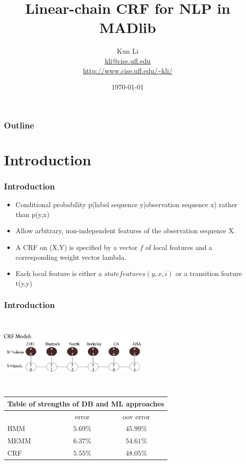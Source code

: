 \documentclass{beamer}
\title[Linear-chain CRF for NLP in MADlib]{
  Linear-chain CRF for NLP in MADlib}
\author[Kun Li]{
  Kun Li \\\medskip
  {\small \url{kli@cise.ufl.edu}} \\ 
  {\small \url{http://www.cise.ufl.edu/~kli/}}}
\institute[University of Florida]{
  Department of Computer \& Information Science \& Engineering\\
  University of Florida}
\date[Data Science Tea]{\today}
\begin{document}
\begin{frame}
  \titlepage
\end{frame}

\begin{frame}
  \frametitle{Outline}

  \tableofcontents
\end{frame}

\section{Introduction}

\begin{frame}
  \frametitle{Introduction}
  \begin{itemize}
    \item Conditional probability p(label sequence y|observation sequence x) rather than p(y,x)
    \item Allow arbitrary, non-independent features of the observation sequence X. 
    \item A CRF on (X,Y) is specified by a vector $f$ of local features and a corresponding weight vector
          lambda.
    \item Each local feature is either a $state feature s(y,x,i)$ or a transition feature t(y,y) 
  \end{itemize}
\end{frame}
\begin{frame}
  \frametitle{Introduction}
  \begin{center}
  \includegraphics[height=10em, width=20em]{crf.jpg}\\
  \begin{tabular}{|l|c|c|}
  \multicolumn{3}{c}{\textbf{Table of strengths of DB and ML approaches}} \\
  \hline
  \textcolor{white}{X} & error & oov error \\
  \hline
  HMM & $5.69\%$ & $45.99\%$ \\
  \hline
  MEMM & $6.37\%$ & $54.61\%$ \\
  \hline
  CRF & $5.55\%$ & $48.05\%$ \\
  \hline
  \hline
  \end{tabular}
  \label{tab:approaches}
  \end{center}
\end{frame}
\end{document}
